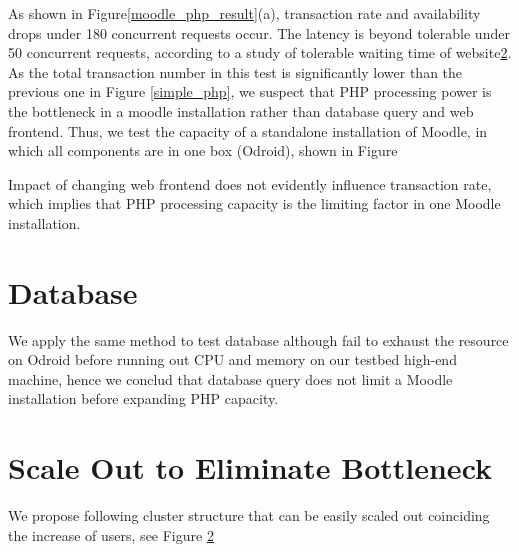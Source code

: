 As shown in Figure\ref{moodle_php_result}(a), transaction rate and availability drops under 180 concurrent requests occur. The latency is beyond tolerable under 50 concurrent requests, according to a study of tolerable waiting time of website\ref{}. As the total transaction number in this test is significantly lower than the previous one in Figure \ref{simple_php}, we suspect that PHP processing power is the bottleneck in a moodle installation rather than database query and web frontend. Thus, we test the capacity of a standalone installation of Moodle, in which all components are in one box (Odroid), shown in Figure {}

Impact of changing web frontend does not evidently influence transaction rate, which implies that PHP processing capacity is the limiting factor in one Moodle installation.

\section{Database}
We apply the same method to test database although fail to exhaust the resource on Odroid before running out CPU and memory on our testbed high-end machine, hence we conclud that database query does not limit a Moodle installation before expanding PHP capacity.

\section{Scale Out to Eliminate Bottleneck}
We propose following cluster structure that can be easily scaled out coinciding the increase of users, see Figure \ref{}

